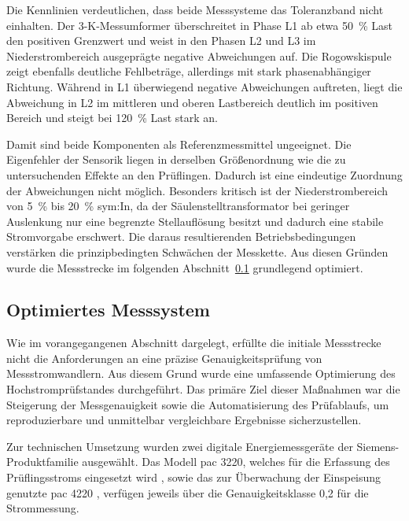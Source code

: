 Die Kennlinien verdeutlichen, dass beide Messsysteme das Toleranzband nicht einhalten. Der 3-K-Messumformer überschreitet in Phase L1 ab etwa \SI{50}{\percent} Last den positiven Grenzwert und weist in den Phasen L2 und L3 im Niederstrombereich ausgeprägte negative Abweichungen auf. Die Rogowskispule zeigt ebenfalls deutliche Fehlbeträge, allerdings mit stark phasenabhängiger Richtung. Während in L1 überwiegend negative Abweichungen auftreten, liegt die Abweichung in L2 im mittleren und oberen Lastbereich deutlich im positiven Bereich und steigt bei \SI{120}{\percent} Last stark an.

Damit sind beide Komponenten als Referenzmessmittel ungeeignet. Die Eigenfehler der Sensorik liegen in derselben Größenordnung wie die zu untersuchenden Effekte an den Prüflingen. Dadurch ist eine eindeutige Zuordnung der Abweichungen nicht möglich. Besonders kritisch ist der Niederstrombereich von \SI{5}{\percent} bis \SI{20}{\percent} \gls{sym:In}, da der Säulenstelltransformator bei geringer Auslenkung nur eine begrenzte Stellauflösung besitzt und dadurch eine stabile Stromvorgabe erschwert. Die daraus resultierenden Betriebsbedingungen verstärken die prinzipbedingten Schwächen der Messkette. Aus diesen Gründen wurde die Messstrecke im folgenden Abschnitt~\ref{sec:optimierung_messsystem} grundlegend optimiert.







\subsection{Optimiertes Messsystem}
\label{sec:optimierung_messsystem}

Wie im vorangegangenen Abschnitt dargelegt, erfüllte die initiale Messstrecke nicht die Anforderungen an eine präzise Genauigkeitsprüfung von Messstromwandlern. Aus diesem Grund wurde eine umfassende Optimierung des Hochstromprüfstandes durchgeführt. Das primäre Ziel dieser Maßnahmen war die Steigerung der Messgenauigkeit sowie die Automatisierung des Prüfablaufs, um reproduzierbare und unmittelbar vergleichbare Ergebnisse sicherzustellen.

Zur technischen Umsetzung wurden zwei digitale Energiemessgeräte der Siemens-Produktfamilie ausgewählt. Das Modell \acrshort{pac} 3220, welches für die Erfassung des Prüflingsstroms eingesetzt wird \cite[S.~97]{pdf-Handbuch_PAC3120-Siemens}, sowie das zur Überwachung der Einspeisung genutzte \acrshort{pac} 4220 \cite[S.~94]{pdf-Handbuch_PAC4220-Siemens}, verfügen jeweils über die Genauigkeitsklasse 0,2 für die Strommessung. 

